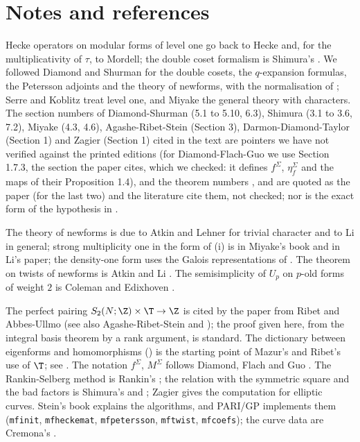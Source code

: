 \section{Notes and references}\label{sec:hecke:notes}

Hecke operators on modular forms of level one go back to Hecke and, for the multiplicativity of $\tau$, to Mordell; the double coset formalism is Shimura's \cite[Chapter 3]{Shimura71}.
We followed Diamond and Shurman \cite[Chapter 5]{DiamondShurman} for the double cosets, the $q$-expansion formulas, the Petersson adjoints and the theory of newforms, with
the normalisation of ; Serre \cite[Chapter VII]{SerreCourse} and Koblitz \cite{Koblitz} treat level one, and Miyake \cite[Chapter 4]{Miyake} the general theory
with characters. The section numbers of Diamond-Shurman (5.1 to 5.10, 6.3), Shimura (3.1 to 3.6, 7.2), Miyake (4.3, 4.6), Agashe-Ribet-Stein (Section 3), Darmon-Diamond-Taylor (Section 1)
and Zagier (Section 1) cited in the text are pointers we have not verified against the printed editions (for Diamond-Flach-Guo we use Section 1.7.3, the section the paper cites, which we checked: it defines $f^\Sigma$, $\eta^\Sigma_f$ and the maps of their Proposition 1.4), and the theorem numbers \cite[Theorem 4.6.19]{Miyake}, \cite[Theorem 3.1]{AtkinLi78} and \cite[Theorem 3]{AtkinLehner70} are quoted as the paper (for the last
two) and the literature cite them, not checked; nor is the exact form of the hypothesis in \cite[Theorem 3.1]{AtkinLi78}.

The theory of newforms is due to Atkin and Lehner \cite{AtkinLehner70} for trivial character and to Li \cite{Li75} in general; strong multiplicity one in the form of
(i) is in Miyake's book and in Li's paper; the density-one form uses the Galois representations of . The theorem on twists of
newforms is Atkin and Li \cite{AtkinLi78}. The semisimplicity of $U_p$ on $p$-old forms of weight $2$ is Coleman and Edixhoven \cite{ColemanEdixhoven}.

The perfect pairing $S_2(N;\Z)\times\T\to\Z$ is cited by the paper from Ribet \cite[Theorem 2.2]{Ribet83} and Abbes-Ullmo \cite[Lemma 2.1]{AU96} (see also Agashe-Ribet-Stein
\cite[Section 3]{ARS12} and \cite[Section 1]{DDT}); the proof given here, from the integral basis theorem by a rank argument, is standard. The dictionary between eigenforms and
homomorphisms () is the starting point of Mazur's and Ribet's use of $\T$; see \cite{DDT}. The notation $f^\Sigma$, $M^\Sigma$ follows Diamond, Flach and Guo
\cite[Section 1.7.3]{DFG04}. The Rankin-Selberg method is Rankin's \cite{Rankin39}; the relation with the symmetric square and the bad factors is Shimura's \cite{Shimura76} and
\cite[Lemma 2.12]{DFG04}; Zagier \cite{Zagier85} gives the computation for elliptic curves. Stein's book \cite{Stein} explains the algorithms, and PARI/GP \cite{PARI} implements them
(\texttt{mfinit}, \texttt{mfheckemat}, \texttt{mfpetersson}, \texttt{mftwist}, \texttt{mfcoefs}); the curve data are Cremona's \cite{Cremona97}.

